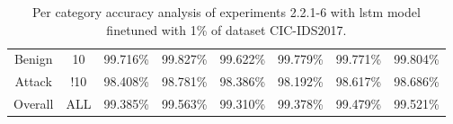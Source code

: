\begin{table}[htb]
{\begin{tabular}{@{}cccccccc@{}}
         \\
        Benign &  10 &  99.716\% &  99.827\% &  99.622\% &  99.779\% &  99.771\% &  99.804\% \\
        Attack &  !10 &  98.408\% &  98.781\% &  98.386\% &  98.192\% &  98.617\% &  98.686\% \\
        Overall &  ALL &  99.385\% &  99.563\% &  99.310\% &  99.378\% &  99.479\% &  99.521\% \\
        \bottomrule
    \end{tabular}}
    \caption{Per category accuracy analysis of experiments 2.2.1-6 with \gls{lstm} model finetuned with 1\% of dataset CIC-IDS2017.}
    \label{table:results:lstm:class_flows_1}
\end{table}